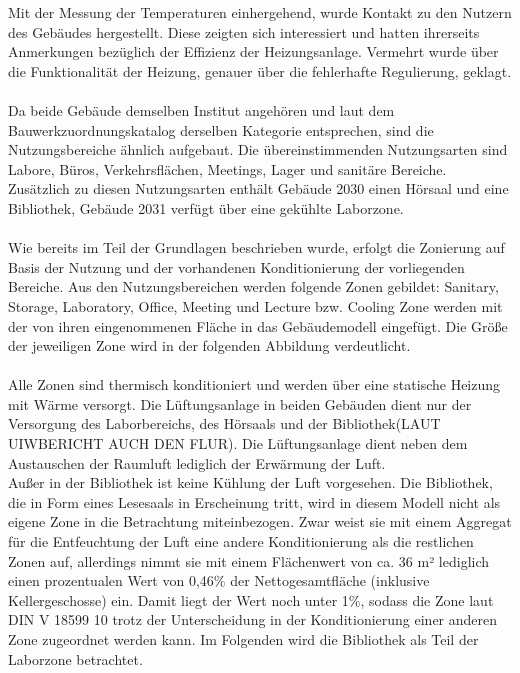 Mit der Messung der Temperaturen einhergehend, wurde Kontakt zu den Nutzern des Gebäudes hergestellt. Diese zeigten sich interessiert und hatten ihrerseits Anmerkungen bezüglich der Effizienz der Heizungsanlage. Vermehrt wurde über die Funktionalität der Heizung, genauer über die fehlerhafte Regulierung, geklagt.\\
\\
Da beide Gebäude demselben Institut angehören und laut dem Bauwerkzuordnungskatalog derselben Kategorie entsprechen, sind die Nutzungsbereiche ähnlich aufgebaut. Die übereinstimmenden Nutzungsarten sind Labore, Büros, Verkehrsflächen, Meetings, Lager und sanitäre Bereiche. Zusätzlich zu diesen Nutzungsarten enthält Gebäude 2030 einen Hörsaal und eine Bibliothek, Gebäude 2031 verfügt über eine gekühlte Laborzone.\\
\\
Wie bereits im Teil der Grundlagen beschrieben wurde, erfolgt die Zonierung auf Basis der Nutzung und der vorhandenen Konditionierung der vorliegenden Bereiche. Aus den Nutzungsbereichen werden folgende Zonen gebildet: Sanitary, Storage, Laboratory, Office, Meeting und Lecture bzw. Cooling Zone werden mit der von ihren eingenommenen Fläche in das Gebäudemodell eingefügt. Die Größe der jeweiligen Zone wird in der folgenden Abbildung verdeutlicht. \\
\\
Alle Zonen sind thermisch konditioniert und werden über eine statische Heizung mit Wärme versorgt. Die Lüftungsanlage in beiden Gebäuden dient nur der Versorgung des Laborbereichs, des Hörsaals und der Bibliothek(LAUT UIWBERICHT AUCH DEN FLUR). Die Lüftungsanlage dient neben dem Austauschen der Raumluft lediglich der Erwärmung der Luft. \\
Außer in der Bibliothek ist keine Kühlung der Luft vorgesehen. Die Bibliothek, die in Form eines Lesesaals in Erscheinung tritt, wird in diesem Modell nicht als eigene Zone in die Betrachtung miteinbezogen. Zwar weist sie mit einem Aggregat für die Entfeuchtung der Luft eine andere Konditionierung als die restlichen Zonen auf, allerdings nimmt sie mit einem Flächenwert von ca. 36 m² lediglich einen prozentualen Wert von 0,46\% der Nettogesamtfläche (inklusive Kellergeschosse) ein. Damit liegt der Wert noch unter 1\%, sodass die Zone laut DIN V 18599 10 trotz der Unterscheidung in der Konditionierung einer anderen Zone zugeordnet werden kann. Im Folgenden wird die Bibliothek als Teil der Laborzone betrachtet. \\
\\
